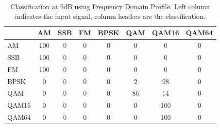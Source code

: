 \begin{table}
\caption{Classification at 5dB using Frequency Domain Profile.  Left column
indicates the input signal, column headers are the classification.}
\centering
\begin{tabular}{ l | c | c | c | c | c | c | c } \hline
      &  AM  &  SSB & FM & BPSK & QAM & QAM16 & QAM64 \\ \hline \hline 
AM    &	 100 &	 0 &	 0 &	 0 &	 0 &	 0 &	 0 \\ \hline  
SSB   &	 100 &	 0 &	 0 &	 0 &	 0 &	 0 &	 0 \\ \hline  
FM    &	 100 &	 0 &	 0 &	 0 &	 0 &	 0 &	 0 \\ \hline  
BPSK  &	 0 &	 0 &	 0 &	 0 &	 2 &	 98 &	 0 \\ \hline  
QAM   &	 0 &	 0 &	 0 &	 0 &	 86 &	 14 &	 0 \\ \hline  
QAM16 &	 0 &	 0 &	 0 &	 0 &	 0 &	 100 &	 0 \\ \hline  
QAM64 &	 0 &	 0 &	 0 &	 0 &	 0 &	 100 &	 0 \\ \hline  
\end{tabular}
\label{tab:cycloFalsePosTable5dB}
\end{table}

